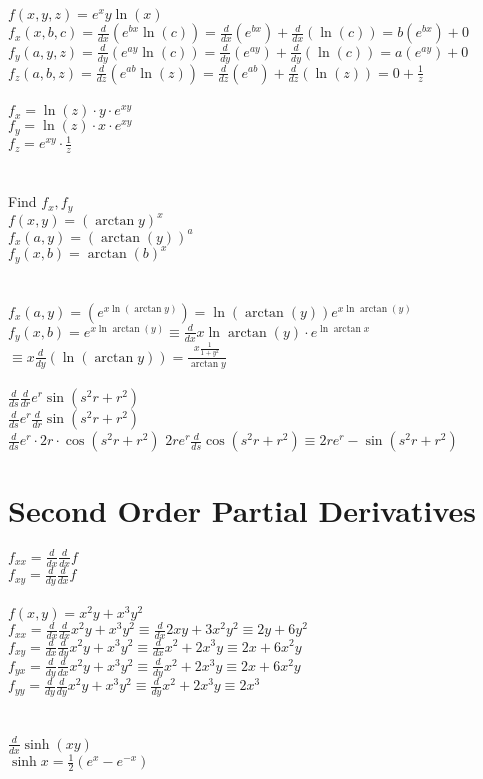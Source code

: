 \documentclass[]{article}
\begin{document}
\\
\\
$f(x,y,z) = e^xy\ln(x)$\\
$f_x(x,b,c) = \frac{d}{dx}(e^{bx}\ln(c)) = \frac{d}{dx}(e^{bx}) + \frac{d}{dx}(\ln(c)) = b(e^{bx}) + 0$\\
$f_y(a,y,z) = \frac{d}{dy}(e^{ay}\ln(c)) = \frac{d}{dy}(e^{ay}) + \frac{d}{dy}(\ln(c)) = a(e^{ay}) + 0$\\
$f_z(a,b,z) = \frac{d}{dz}(e^{ab}\ln(z)) = \frac{d}{dz}(e^{ab}) + \frac{d}{dz}(\ln(z)) = 0 + \frac{1}{z}$\\
\\
$f_x = \ln(z) \cdot y \cdot e^{xy}$\\
$f_y = \ln(z) \cdot x \cdot e^{xy}$\\
$f_z = e^{xy} \cdot \frac{1}{z}$\\
\\
\\
Find $f_x, f_y$\\
$f(x,y) = (\arctan{y})^x$\\
$f_x(a,y) = (\arctan(y))^a$\\
$f_y(x, b) = \arctan(b)^x$\\
\\
\\
$f_x(a,y) = (e^{x\ln(\arctan{y})}) = \ln(\arctan(y))e^{x\ln\arctan(y)}$\\
$f_y(x, b) = e^{x\ln\arctan(y)} \equiv \frac{d}{dx}x\ln\arctan(y) \cdot e^{\ln\arctan x}$\\
$\equiv x \frac{d}{dy}(\ln(\arctan y)) = \frac{x \frac{1}{1+y^2}}{\arctan y}$
\\
\\      
$\frac{d}{ds} \frac{d}{dr} e^r \sin(s^2r+r^2)$\\
$\frac{d}{ds} e^r \frac{d}{dr}  \sin(s^2r+r^2)$\\
$\frac{d}{ds} e^r \cdot 2r \cdot \cos(s^2r+r^2)$
$2re^r \frac{d}{ds} \cos(s^2r + r^2)  \equiv 2re^r -\sin(s^2r + r^2)$

\newpage
\section*{Second Order Partial Derivatives}
$f_{xx} = \frac{d}{dx}\frac{d}{dx}f$\\
$f_{xy} = \frac{d}{dy}\frac{d}{dx}f$\\
\\
$f(x,y) = x^2y + x^3y^2$\\
$f_{xx} = \frac{d}{dx}\frac{d}{dx} x^2y + x^3y^2 \equiv \frac{d}{dx}2xy+3x^2y^2 \equiv 2y+6y^2$\\
$f_{xy} = \frac{d}{dx}\frac{d}{dy} x^2y + x^3y^2 \equiv \frac{d}{dx} x^2+2x^3y \equiv 2x+6x^2y $\\
$f_{yx} = \frac{d}{dy}\frac{d}{dx} x^2y + x^3y^2 \equiv \frac{d}{dy}x^2+2x^3y \equiv 2x+6x^2y$\\
$f_{yy} = \frac{d}{dy}\frac{d}{dy} x^2y + x^3y^2 \equiv \frac{d}{dy}x^2+2x^3y \equiv 2x^3$\\
\\
\\
$\frac{d}{dx}\sinh(xy)$\\
$\sinh{x} = \frac{1}{2}(e^x-e^{-x})$
\end{document}
